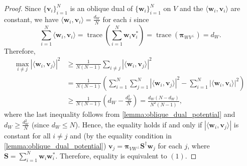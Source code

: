 \documentclass[10pt,a4paper]{amsart}
\DeclareMathOperator{\trace}{trace}
\newcommand{\bpi}{{\boldsymbol{\pi}}}
\begin{document}
\begin{proof}
Since $\{\mathbf{v}_i\}_{i=1}^N$ is an oblique dual of $\{\mathbf{w}_i\}_{i=1}^N$ on $V$ and the $\langle \mathbf{w}_i, \mathbf{v}_i \rangle$ are constant, we have 
$\langle \mathbf{w}_i, \mathbf{v}_i \rangle = \frac{d_W}{N}$ for each $i$ since
\begin{equation*}
   \sum_{i=1}^N \langle \mathbf{w}_i, \mathbf{v}_i \rangle = \trace\left( \sum_{i=1}^N \mathbf{w}_i \mathbf{v}_i^*\right)=\trace(\bpi_{WV^\perp}) =d_W. 
\end{equation*}
Therefore, 
    \begin{equation*}
    \begin{split}
        \underset{i \neq j}{\text{max}} \ |\langle \mathbf{w}_i, \mathbf{v}_j \rangle |^2 &\geq \frac{1}{N(N-1)} \sum_{i \neq j} |\langle \mathbf{w}_i, \mathbf{v}_j \rangle |^2 \\
        &= \frac{1}{N(N-1)} \left( \sum_{i=1}^N \sum_{j=1}^N | \langle \mathbf{w}_i, \mathbf{v}_j \rangle |^2 - \sum_{i=1}^N |\langle \mathbf{w}_i, \mathbf{v}_i \rangle |^2 \right) \\
        & \geq \frac{1}{N(N-1)} \left( d_W - \frac{d_W^2}{N} \right) = \frac{d_W(N-d_W)}{N^2(N-1)},
    \end{split}
    \end{equation*}
where the last inequality follows from \cref{lemma:oblique_dual_potential} and $d_W \geq \frac{d_W^2}{N}$ (since $d_W \leq N$).
Hence, the equality holds if and only if $|\langle \mathbf{w}_i, \mathbf{v}_j \rangle |$ is constant for all $ i \neq j$ and (by the equality condition in \cref{lemma:oblique_dual_potential}) $\mathbf{v}_j = \bpi_{VW^\perp} \mathbf{S}^\dagger \mathbf{w}_j$ for each $j$, where $\mathbf{S} = \sum\limits_{i=1}^N \mathbf{w}_i\mathbf{w}_i^*$. Therefore, equality is equivalent to $(1)$.


\end{proof}
\end{document}
